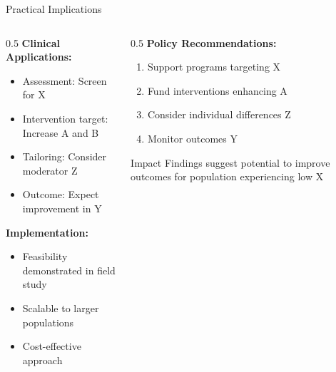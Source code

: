 \documentclass[aspectratio=169,12pt]{beamer}
\begin{document}
\begin{frame}{Practical Implications}
  \begin{columns}[T]
    
    \begin{column}{0.5\textwidth}
      \textbf{Clinical Applications:}
      \begin{itemize}
        \item Assessment: Screen for X
        \item Intervention target: Increase A and B
        \item Tailoring: Consider moderator Z
        \item Outcome: Expect improvement in Y
      \end{itemize}
      
      \vspace{0.5cm}
      
      \textbf{Implementation:}
      \begin{itemize}
        \item Feasibility demonstrated in field study
        \item Scalable to larger populations
        \item Cost-effective approach
      \end{itemize}
    \end{column}
    
    \begin{column}{0.5\textwidth}
      \textbf{Policy Recommendations:}
      \begin{enumerate}
        \item Support programs targeting X
        \item Fund interventions enhancing A
        \item Consider individual differences Z
        \item Monitor outcomes Y
      \end{enumerate}
      
      \vspace{0.5cm}
      
      \begin{alertblock}{Impact}
        Findings suggest potential to improve outcomes for population experiencing low X
      \end{alertblock}
    \end{column}
    
  \end{columns}
\end{frame}
\end{document}
